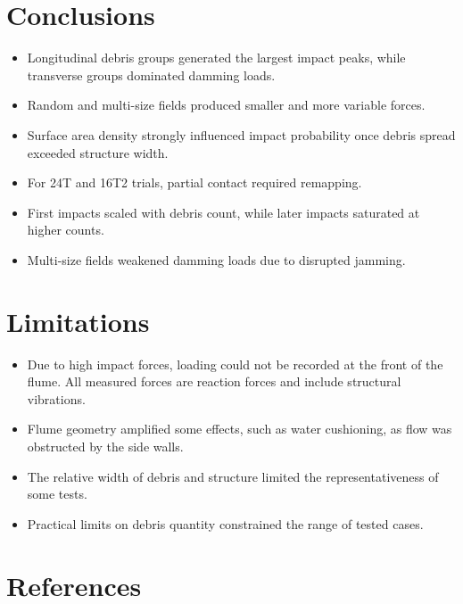 \documentclass{article}
\begin{document}

\section{Conclusions}
\begin{itemize}
    \item Longitudinal debris groups generated the largest impact peaks, while transverse groups dominated damming loads.
    \item Random and multi-size fields produced smaller and more variable forces.
    \item Surface area density strongly influenced impact probability once debris spread exceeded structure width.
    \item For 24T and 16T2 trials, partial contact required remapping.
    \item First impacts scaled with debris count, while later impacts saturated at higher counts.
    \item Multi-size fields weakened damming loads due to disrupted jamming.
\end{itemize}

\section{Limitations}
\begin{itemize}
    \item Due to high impact forces, loading could not be recorded at the front of the flume. All measured forces are reaction forces and include structural vibrations.
    \item Flume geometry amplified some effects, such as water cushioning, as flow was obstructed by the side walls.
    \item The relative width of debris and structure limited the representativeness of some tests.
    \item Practical limits on debris quantity constrained the range of tested cases.
\end{itemize}
\section{References}
\end{document}
